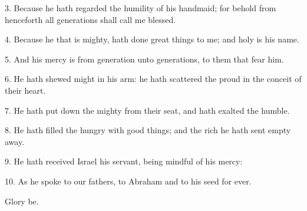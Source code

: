 

3. Because he hath regarded the humility of his handmaid; for behold from henceforth all generations shall call me blessed.

4. Because he that is mighty, hath done great things to me; and holy is his name.

5. And his mercy is from generation unto generations, to them that fear him.

6. He hath shewed might in his arm: he hath scattered the proud in the conceit of their heart.

7. He hath put down the mighty from their seat, and hath exalted the humble.

8. He hath filled the hungry with good things; and the rich he hath sent empty away.

9. He hath received Israel his servant, being mindful of his mercy: 

10. As he spoke to our fathers, to Abraham and to his seed for ever. 

Glory be.